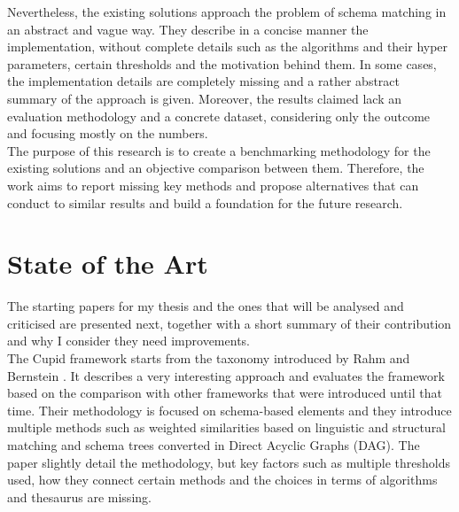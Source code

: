 \documentclass[a4paper]{article}
\begin{document}
Nevertheless, the existing solutions approach the problem of schema matching in an abstract and vague way. They describe in a concise manner the implementation, without complete details such as the algorithms and their hyper parameters, certain thresholds and the motivation behind them. In some cases, the implementation details are completely missing and a rather abstract summary of the approach is given. Moreover, the results claimed lack an evaluation methodology and a concrete dataset, considering only the outcome and focusing mostly on the numbers. \\

The purpose of this research is to create a benchmarking methodology for the existing solutions and an objective comparison between them. Therefore, the work aims to report missing key methods and propose alternatives that can conduct to similar results and build a foundation for the future research.  



\section{State of the Art}
The starting papers for my thesis and the ones that will be analysed and criticised are presented next, together with a short summary of their contribution and why I consider they need improvements. \\

The Cupid framework \cite{madhavan2001generic} starts from the taxonomy introduced by Rahm and Bernstein \cite{rahm2001matching}. It describes a very interesting approach and evaluates the framework based on the comparison with other frameworks that were introduced until that time. Their methodology is focused on schema-based elements and they introduce multiple methods such as weighted similarities based on linguistic and structural matching and schema trees converted in Direct Acyclic Graphs (DAG). The paper slightly detail the methodology, but key factors such as multiple thresholds used, how they connect certain methods and the choices in terms of algorithms and thesaurus are missing. \\
\end{document}
